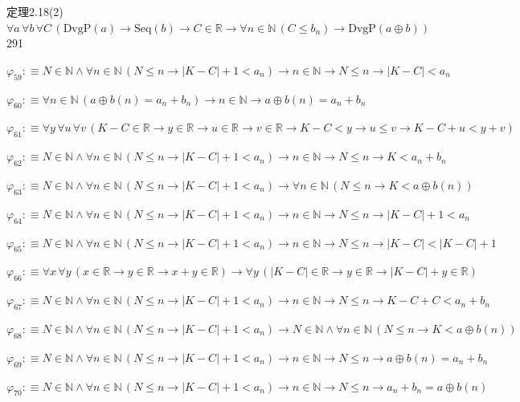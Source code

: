\begin{fullproof}{定理2.18(2)}{$\forall a\,\forall b\,\forall C\,(\mathrm{DvgP}(a) \to \mathrm{Seq}(b) \to C \in \mathbb{R} \to \forall n \in \mathbb{N}\,(C \leq b_{n}) \to \mathrm{DvgP}(a \oplus b))$}{291}
\begin{abbrevlist}
\item $\varphi_{59} :\equiv N \in \mathbb{N} \land \forall n \in \mathbb{N}\,(N \leq n \to \lvert K - C \rvert + 1 < a_{n}) \to n \in \mathbb{N} \to N \leq n \to \lvert K - C \rvert < a_{n}$
\item $\varphi_{60} :\equiv \forall n \in \mathbb{N}\,(a \oplus b(n) = a_{n} + b_{n}) \to n \in \mathbb{N} \to a \oplus b(n) = a_{n} + b_{n}$
\item $\varphi_{61} :\equiv \forall y\,\forall u\,\forall v\,(K - C \in \mathbb{R} \to y \in \mathbb{R} \to u \in \mathbb{R} \to v \in \mathbb{R} \to K - C < y \to u \leq v \to K - C + u < y + v)$
\item $\varphi_{62} :\equiv N \in \mathbb{N} \land \forall n \in \mathbb{N}\,(N \leq n \to \lvert K - C \rvert + 1 < a_{n}) \to n \in \mathbb{N} \to N \leq n \to K < a_{n} + b_{n}$
\item $\varphi_{63} :\equiv N \in \mathbb{N} \land \forall n \in \mathbb{N}\,(N \leq n \to \lvert K - C \rvert + 1 < a_{n}) \to \forall n \in \mathbb{N}\,(N \leq n \to K < a \oplus b(n))$
\item $\varphi_{64} :\equiv N \in \mathbb{N} \land \forall n \in \mathbb{N}\,(N \leq n \to \lvert K - C \rvert + 1 < a_{n}) \to n \in \mathbb{N} \to N \leq n \to \lvert K - C \rvert + 1 < a_{n}$
\item $\varphi_{65} :\equiv N \in \mathbb{N} \land \forall n \in \mathbb{N}\,(N \leq n \to \lvert K - C \rvert + 1 < a_{n}) \to n \in \mathbb{N} \to N \leq n \to \lvert K - C \rvert < \lvert K - C \rvert + 1$
\item $\varphi_{66} :\equiv \forall x\,\forall y\,(x \in \mathbb{R} \to y \in \mathbb{R} \to x + y \in \mathbb{R}) \to \forall y\,(\lvert K - C \rvert \in \mathbb{R} \to y \in \mathbb{R} \to \lvert K - C \rvert + y \in \mathbb{R})$
\item $\varphi_{67} :\equiv N \in \mathbb{N} \land \forall n \in \mathbb{N}\,(N \leq n \to \lvert K - C \rvert + 1 < a_{n}) \to n \in \mathbb{N} \to N \leq n \to K - C + C < a_{n} + b_{n}$
\item $\varphi_{68} :\equiv N \in \mathbb{N} \land \forall n \in \mathbb{N}\,(N \leq n \to \lvert K - C \rvert + 1 < a_{n}) \to N \in \mathbb{N} \land \forall n \in \mathbb{N}\,(N \leq n \to K < a \oplus b(n))$
\item $\varphi_{69} :\equiv N \in \mathbb{N} \land \forall n \in \mathbb{N}\,(N \leq n \to \lvert K - C \rvert + 1 < a_{n}) \to n \in \mathbb{N} \to N \leq n \to a \oplus b(n) = a_{n} + b_{n}$
\item $\varphi_{70} :\equiv N \in \mathbb{N} \land \forall n \in \mathbb{N}\,(N \leq n \to \lvert K - C \rvert + 1 < a_{n}) \to n \in \mathbb{N} \to N \leq n \to a_{n} + b_{n} = a \oplus b(n)$

\end{abbrevlist}
\end{fullproof}

